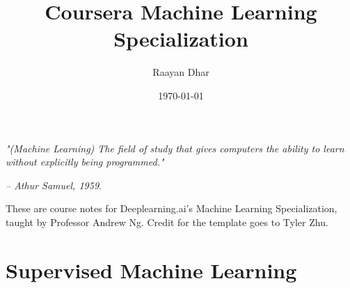 \documentclass[11 pt]{scrartcl}
\begin{document}
 
\title{\Large Coursera Machine Learning Specialization}
\author{\large Raayan Dhar}
\date{\large\today}

\maketitle 

\begin{center}
\begin{displayquote}
    \emph{"(Machine Learning) The field of study that gives computers the ability to learn without explicitly being programmed."} \\ \begin{flushright} \emph{– Athur Samuel, 1959}.  \end{flushright}
\end{displayquote}
\end{center}


These are course notes for Deeplearning.ai's Machine Learning Specialization, taught by Professor Andrew Ng. Credit for the template goes to Tyler Zhu.

\tableofcontents 

\newpage

\section{Supervised Machine Learning}
\end{document}
